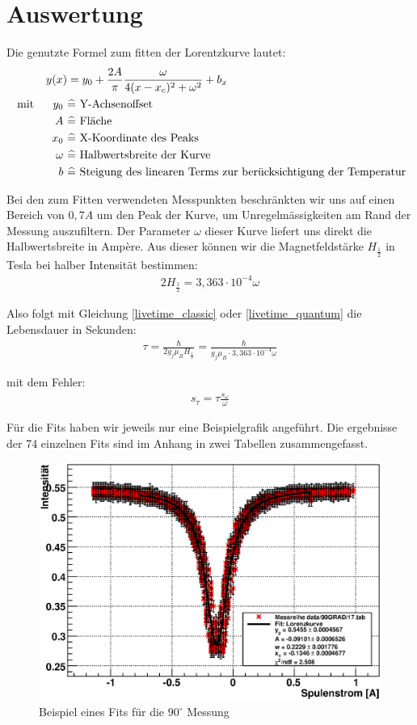 \documentclass[12pt]{article}
\begin{document}
\section{Auswertung}
Die genutzte Formel zum fitten der Lorentzkurve lautet:
\begin{align}
 y(x) &= y_0+\frac{2A}{\pi}\frac{\omega}{4(x-x_c)^2+\omega^2}+b_x \\
\notag \textnormal{ mit }~~~~ y_0~&\widehat{=} \textnormal{ Y-Achsenoffset } \\
\notag A~ &\widehat{=} \textnormal{ Fläche } \\
\notag x_0~ &\widehat{=} \textnormal{ X-Koordinate des Peaks } \\
\notag \omega~ &\widehat{=} \textnormal{ Halbwertsbreite der Kurve } \\
\notag b~ &\widehat{=} \textnormal{ Steigung des linearen Terms zur berücksichtigung der Temperatur}
\end{align}

Bei den zum Fitten verwendeten Messpunkten beschränkten wir uns auf einen Bereich von $0,7A$ um den Peak der Kurve, um
Unregelmässigkeiten am Rand der Messung auszufiltern. Der Parameter $\omega$ dieser Kurve liefert uns direkt die
Halbwertsbreite in Ampère. Aus dieser können wir die Magnetfeldstärke $H_{\frac{1}{2}}$ in Tesla bei halber Intensität bestimmen:
\begin{align}
 2H_{\frac{1}{2}}= 3,363\cdot 10^{-4} \omega
\end{align}

Also folgt mit Gleichung \ref{livetime_classic} oder \ref{livetime_quantum} die Lebensdauer in Sekunden:
\begin{align}
 \tau = \frac{\hbar}{2g_j \mu_B H_{\frac{1}{2}}} = \frac{\hbar}{g_j \mu_B\cdot 3,363\cdot 10^{-4} \omega}
\end{align}

mit dem Fehler:
\begin{align}
 s_{\tau}=\tau \frac{s_{\omega}}{\omega}
\end{align}

Für die Fits haben wir jeweils nur eine Beispielgrafik angeführt. Die ergebnisse der 74 einzelnen Fits sind im Anhang in zwei Tabellen zusammengefasst.

\begin{figure}[H]  
\centering
\includegraphics[width=0.9\linewidth]{pictures/9017eps.eps}
\caption{Beispiel eines Fits für die $90^\circ$ Messung}
\end{figure}
\end{document}
